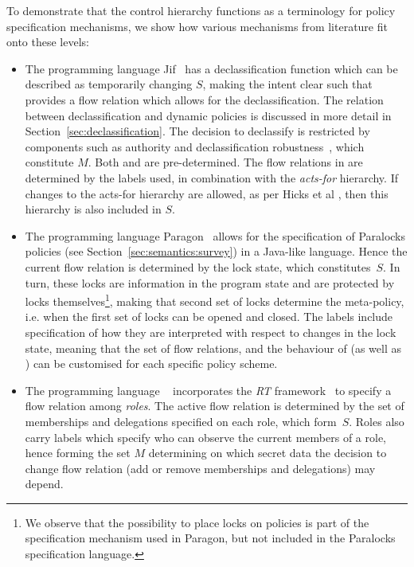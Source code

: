 To demonstrate that the control hierarchy functions as a terminology for policy specification mechanisms, 
we show how various mechanisms from literature fit onto these levels:
\begin{itemize}

  \item The programming language Jif~\cite{Myers:POPL99} has a declassification function which can be
        described as temporarily changing $S$, making the intent clear such that \dynamicpol{} provides
        a flow relation which allows for the declassification.
        The relation between declassification and dynamic policies is discussed in more detail in 
        Section~\ref{sec:declassification}.
        The decision to declassify is restricted by components such as authority and declassification
        robustness~\cite{Zdancewic:Myers:CSFW01}, which constitute $M$. Both \dynamicpol{} and \metapol{}
        are pre-determined.
        The flow relations in \orderings{} are determined by the labels used, in combination with the
        \emph{acts-for} hierarchy. If changes to the acts-for hierarchy are allowed, 
        as per Hicks et al \cite{Hicks+:Dynamic}, then this hierarchy is also included in $S$.

  \item The programming language Paragon~\cite{Paragon} allows for the specification of Paralocks policies (see Section~\ref{sec:semantics:survey}) in a Java-like language.
        Hence the current flow relation is determined by the lock state, 
        which constitutes~$S$. In turn, these locks are information in the program state and are protected by
        locks themselves\footnote{We observe that the possibility to place locks on policies is part of the 
        specification mechanism used in Paragon, but not included in the Paralocks specification language.}, 
        making that second set of locks determine the meta-policy, i.e. when the first set of locks can be 
        opened and closed. The labels include specification of how they are interpreted with respect to
        changes in the lock state, meaning that the set of flow relations, and the behaviour of \dynamicpol{}
        (as well as \metapol{}) can be customised for each specific policy scheme.

  \item The programming language \Rx{}~\cite{Swamy+:Managing} incorporates the \textit{RT} 
        framework~\cite{Li:Mitchell:Winsborough:Design} to specify a flow relation among \emph{roles}.
        The active flow relation is determined by the set of memberships and delegations specified on
        each role, which form~$S$.
        Roles also carry labels which specify who can observe the current members of a role, hence
        forming the set $M$ determining on which secret data the decision to change flow relation
        (add or remove memberships and delegations) may depend.
  

\end{itemize}
